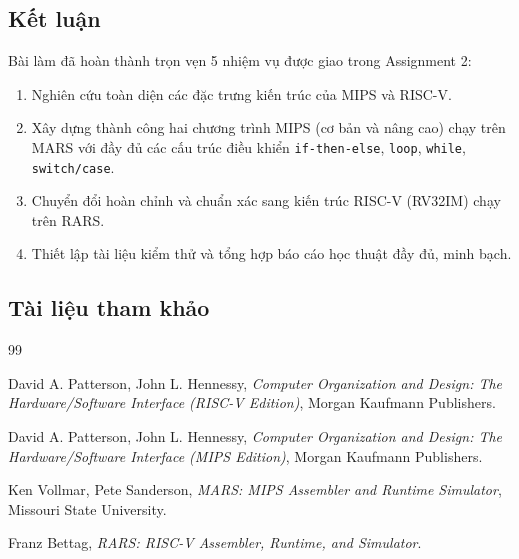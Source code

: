 \documentclass[12pt,a4paper]{article}
\begin{document}
\subsection{Kết luận}
Bài làm đã hoàn thành trọn vẹn 5 nhiệm vụ được giao trong Assignment 2:
\begin{enumerate}
    \item Nghiên cứu toàn diện các đặc trưng kiến trúc của MIPS và RISC-V.
    \item Xây dựng thành công hai chương trình MIPS (cơ bản và nâng cao) chạy trên MARS với đầy đủ các cấu trúc điều khiển \texttt{if-then-else}, \texttt{loop}, \texttt{while}, \texttt{switch/case}.
    \item Chuyển đổi hoàn chỉnh và chuẩn xác sang kiến trúc RISC-V (RV32IM) chạy trên RARS.
    \item Thiết lập tài liệu kiểm thử và tổng hợp báo cáo học thuật đầy đủ, minh bạch.
\end{enumerate}

\subsection{Tài liệu tham khảo}
\begin{thebibliography}{99}

David A. Patterson, John L. Hennessy, 
\emph{Computer Organization and Design: The Hardware/Software Interface (RISC-V Edition)}, 
Morgan Kaufmann Publishers.

David A. Patterson, John L. Hennessy, 
\emph{Computer Organization and Design: The Hardware/Software Interface (MIPS Edition)}, 
Morgan Kaufmann Publishers.

Ken Vollmar, Pete Sanderson, 
\emph{MARS: MIPS Assembler and Runtime Simulator}, Missouri State University.

Franz Bettag, 
\emph{RARS: RISC-V Assembler, Runtime, and Simulator}.

\end{thebibliography}
\end{document}
